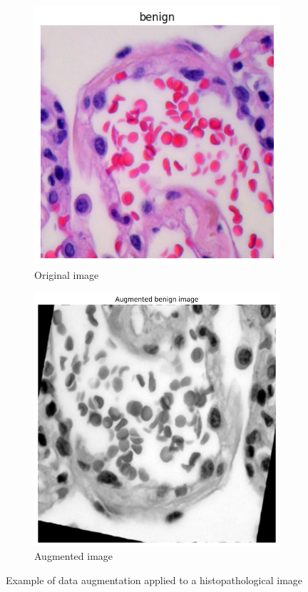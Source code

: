 \documentclass[10pt,twocolumn]{article}
\begin{document}
\begin{figure}[h]
\centering
\begin{subfigure}{0.48\columnwidth}
\includegraphics[width=\linewidth]{imgs/normal_image.png}
\caption{Original image}
\end{subfigure}
\hfill
\begin{subfigure}{0.48\columnwidth}
\includegraphics[width=\linewidth]{imgs/augmented_image.png}
\caption{Augmented image}
\end{subfigure}
\caption{Example of data augmentation applied to a histopathological image}
\label{fig:augmentation}
\end{figure}
\end{document}

